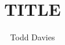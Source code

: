 \newcommand{\Author}{Todd Davies} 
\newcommand{\Title}{TITLE}
\newcommand{\coursecode}{COURSE CODE}
\newcommand{\courseinfo}{}
\author{\Author}
\title{\Title}
